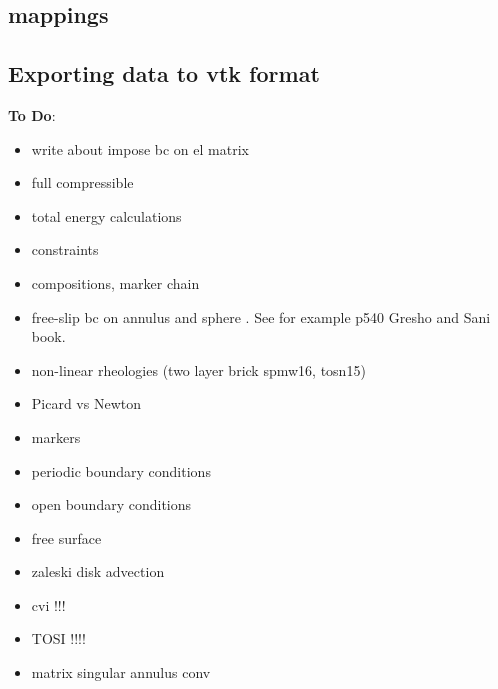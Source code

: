 \documentclass[a4paper]{article}
\begin{document}
\subsection{mappings}  %

\newpage %
\subsection{Exporting data to vtk format}  %







\newpage
{\bf To Do}:

\begin{itemize}
\item
write about impose bc on el matrix

\item
full compressible 

\item
total energy calculations

\item
constraints

\item
compositions, marker chain

\item
free-slip bc on annulus and sphere . See for example p540 Gresho and Sani book.

\item
non-linear rheologies (two layer brick spmw16, tosn15) 

\item
Picard vs Newton

\item
markers

\item
periodic boundary conditions

\item
open boundary conditions

\item
free surface 

\item
zaleski disk advection

\item
cvi !!!

\item TOSI !!!!

\item matrix singular annulus conv


\end{itemize}
\end{document}
